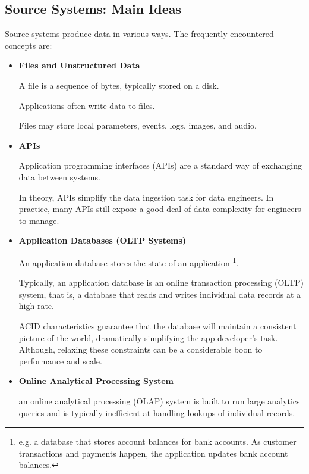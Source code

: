 \subsection{Source Systems: Main Ideas}
Source systems produce data in various ways. The frequently
encountered concepts are:
\begin{itemize}
    \item \textbf{Files and Unstructured Data}

    \noindent
    A file is a sequence of bytes, typically stored on a disk.
    
    Applications often write data to files.
    
    Files may store local parameters, events, logs, images, and
    audio.


    \item \textbf{APIs}

    \noindent
    Application programming interfaces (APIs) are a standard way of
    exchanging data between systems.
    
    In theory, APIs simplify the data ingestion task for data
    engineers. In practice, many APIs still expose a good deal of
    data complexity for engineers to manage.


    \item \textbf{Application Databases (OLTP Systems)}

    \noindent
    An application database stores the state of an application
    \footnote{
        e.g. a database that stores account balances for bank
        accounts. As customer transactions and payments happen,
        the application updates bank account balances.
    }.

    Typically, an application database is an online transaction
    processing (OLTP) system, that is, a database that reads
    and writes individual data records at a high rate.

    ACID characteristics guarantee that the database will maintain
    a consistent picture of the world, dramatically simplifying
    the app developer's task. Although, relaxing these constraints
    can be a considerable boon to performance and scale.


    \item \textbf{Online Analytical Processing System}

    \noindent
    an online analytical processing (OLAP) system is built to run
    large analytics queries and is typically inefficient at
    handling lookups of individual records.



\end{itemize}
